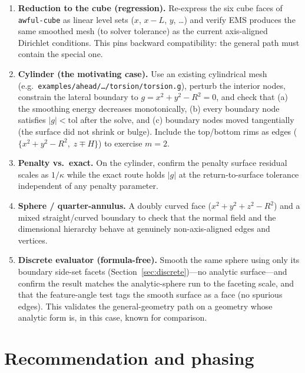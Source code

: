 \documentclass[11pt]{article}
\newcommand{\code}[1]{\texttt{#1}}
\begin{document}
\begin{enumerate}[nosep]
  \item \textbf{Reduction to the cube (regression).} Re-express the six cube
  faces of \code{awful-cube} as linear level sets ($x$, $x-L$, $y$, \dots) and
  verify EMS produces the same smoothed mesh (to solver tolerance) as the
  current axis-aligned Dirichlet conditions. This pins backward compatibility:
  the general path must contain the special one.
  \item \textbf{Cylinder (the motivating case).} Use an existing cylindrical
  mesh (e.g.\ \code{examples/\allowbreak ahead/\allowbreak \dots/torsion/\allowbreak torsion.g}), perturb the
  interior nodes, constrain the lateral boundary to
  $g=x^2+y^2-R^2=0$, and check that (a) the smoothing energy decreases
  monotonically, (b) every boundary node satisfies $|g|<\text{tol}$ after the
  solve, and (c) boundary nodes moved tangentially (the surface did not
  shrink or bulge). Include the top/bottom rims as edges
  ($\{x^2+y^2-R^2,\; z\mp H\}$) to exercise $m=2$.
  \item \textbf{Penalty vs.\ exact.} On the cylinder, confirm the penalty
  surface residual scales as $1/\kappa$ while the exact route holds
  $|g|$ at the return-to-surface tolerance independent of any penalty
  parameter.
  \item \textbf{Sphere / quarter-annulus.} A doubly curved face
  ($x^2+y^2+z^2-R^2$) and a mixed straight/curved boundary to check that the
  normal field and the dimensional hierarchy behave at genuinely
  non-axis-aligned edges and vertices.
  \item \textbf{Discrete evaluator (formula-free).} Smooth the same sphere using
  only its boundary side-set facets (Section~\ref{sec:discrete})---no analytic
  surface---and confirm the result matches the analytic-sphere run to the
  faceting scale, and that the feature-angle test tags the smooth surface as a
  face (no spurious edges). This validates the general-geometry path on a
  geometry whose analytic form is, in this case, known for comparison.
\end{enumerate}

\section{Recommendation and phasing}
\label{sec:phasing}
\end{document}

